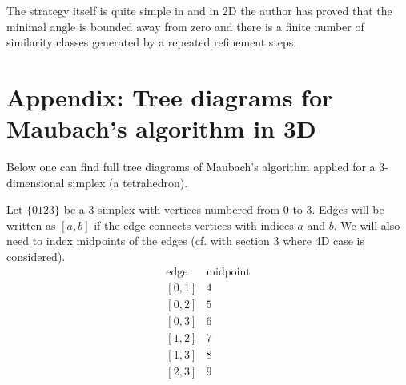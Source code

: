 \documentclass[a4paper,12pt]{amsart}
\numberwithin{equation}{section}
\begin{document}
The strategy itself is quite simple in \cite{rivara} and in 2D the author has proved that the minimal angle is bounded away from zero and there is a finite number of similarity classes generated by a repeated refinement steps.

\section{Appendix: Tree diagrams for Maubach's algorithm in 3D}

Below one can find full tree diagrams of Maubach's algorithm applied for a 3-dimensional simplex (a tetrahedron).

Let $\{0123\}$ be a 3-simplex with vertices numbered from 0 to 3. Edges will be written as $[a,b]$ if the edge connects vertices with indices $a$ and $b$.
We will also need to index midpoints of the edges (cf. with section 3 where 4D case is considered). 
$$
\begin{array}{cc}
\mbox{edge} & \mbox{midpoint} \\
\left[0,1\right] & 4 \\
\left[0,2\right] & 5 \\
\left[0,3\right] & 6 \\
\left[1,2\right] & 7 \\
\left[1,3\right] & 8 \\
\left[2,3\right] & 9 \\
\end{array}
$$
\end{document}
